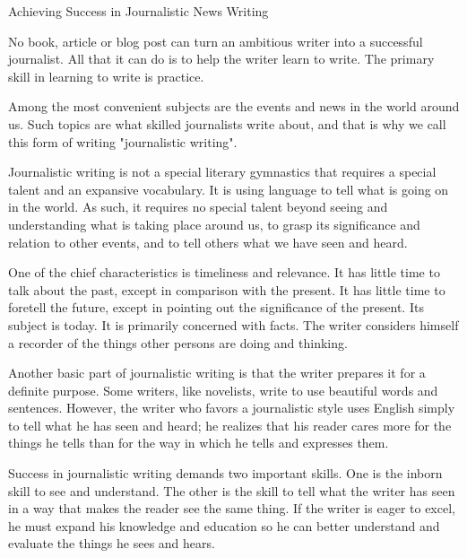 \documentclass{英语试卷}
\begin{document}
\par Achieving Success in Journalistic News Writing\par
\par No book, article or blog post can turn an ambitious writer into a successful journalist. All that it can do is to help the writer learn to write. The primary skill in learning to write is practice. \par
\par Among the most convenient subjects are the events and news in the world around us. Such topics are what skilled journalists write about, and that is why we call this form of writing "journalistic writing".\par
\par Journalistic writing is not a special literary gymnastics that requires a special talent and an expansive vocabulary.  It is using language to tell what is going on in the world. As such, it requires no special talent beyond seeing and understanding what is taking place around us, to grasp its significance and relation to other events, and to tell others what we have seen and heard.\par
\par {} One of the chief characteristics is timeliness and relevance. It has little time to talk about the past, except in comparison with the present. It has little time to foretell the future, except in pointing out the significance of the present. Its subject is today. It is primarily concerned with facts. The writer considers himself a recorder of the things other persons are doing and thinking.\par
\par Another basic part of journalistic writing is that the writer prepares it for a definite purpose. Some writers, like novelists, write to use beautiful words and sentences.  However, the writer who favors a journalistic style uses English simply to tell what he has seen and heard; he realizes that his reader cares more for the things he tells than for the way in which he tells and expresses them.\par
\par Success in journalistic writing demands two important skills. One is the inborn skill to see and understand. The other is the skill to tell what the writer has seen in a way that makes the reader see the same thing.  If the writer is eager to excel, he must expand his knowledge and education so he can better understand and evaluate the things he sees and hears.\par
\end{document}
